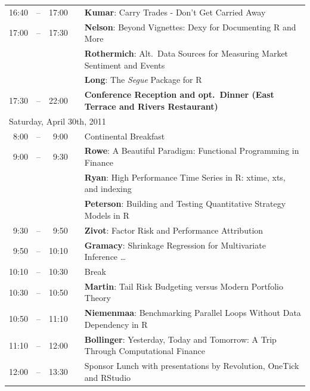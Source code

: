 \documentclass[letterpaper,10pt]{article}
\newcommand{\mylinecolor}[1]{\color{#1}\vspace{-8pt}}  %
\begin{document}
\begin{tabular}{rlrlp{5in}}
16:40&\color{Breaks}-- & 17:00&   &\textbf{\color{Talk} Kumar}: \small{Carry Trades - Don't Get Carried Away} \\
17:00&\color{Breaks}-- & 17:30&   &\textbf{\color{LightningTalk} Nelson}: \small{Beyond Vignettes: Dexy for Documenting R and More} \\
     & &      &   &\textbf{\color{LightningTalk} Rothermich}: \small{Alt.~Data Sources for Measuring Market Sentiment and Events} \\
     & &      &   &\textbf{\color{LightningTalk} Long}: \small{The \emph{Segue} Package for R} \\
17:30&\color{Breaks}-- & 22:00&   &\textbf{\color{Breaks} Conference Reception and opt.~Dinner (East Terrace and Rivers Restaurant)} \\[12pt]
\multicolumn{5}{l}{\large \color{Breaks}Saturday, April 30th, 2011} \\[10pt]
 8:00&\color{Breaks}-- &  9:00&   &\small{\mylinecolor{Breaks} Continental Breakfast} \\
 9:00&\color{Breaks}-- &  9:30&   &\textbf{\color{LightningTalk} Rowe}: \small{A Beautiful Paradigm: Functional Programming in Finance} \\
     & &      &   &\textbf{\color{LightningTalk} Ryan}: \small{High Performance Time Series in R: xtime, xts, and indexing} \\
     & &      &   &\textbf{\color{LightningTalk} Peterson}: \small{Building and Testing Quantitative Strategy Models in R} \\
 9:30&\color{Breaks}-- &  9:50&   &\textbf{\color{Talk} Zivot}: \small{Factor Risk and Performance Attribution} \\
 9:50&\color{Breaks}-- & 10:10&   &\textbf{\color{Talk} Gramacy}: \small{Shrinkage Regression for Multivariate Inference \ldots} \\
10:10&\color{Breaks}-- & 10:30&   &\small{\mylinecolor{Breaks} Break} \\
10:30&\color{Breaks}-- & 10:50&   &\textbf{\color{Talk} Martin}: \small{Tail Risk Budgeting versus Modern Portfolio Theory} \\
10:50&\color{Breaks}-- & 11:10&   &\textbf{\color{Talk} Niemenmaa}: \small{Benchmarking Parallel Loops Without Data Dependency in R} \\
11:10&\color{Breaks}-- & 12:00&   &\textbf{\color{KeynoteTalk} Bollinger}: \small{Yesterday, Today and Tomorrow: A Trip Through Computational Finance} \\
12:00&\color{Breaks}-- & 13:30&   &\small{\mylinecolor{Breaks} Sponsor Lunch with presentations by Revolution, OneTick and RStudio} \\

\end{tabular}
\end{document}
